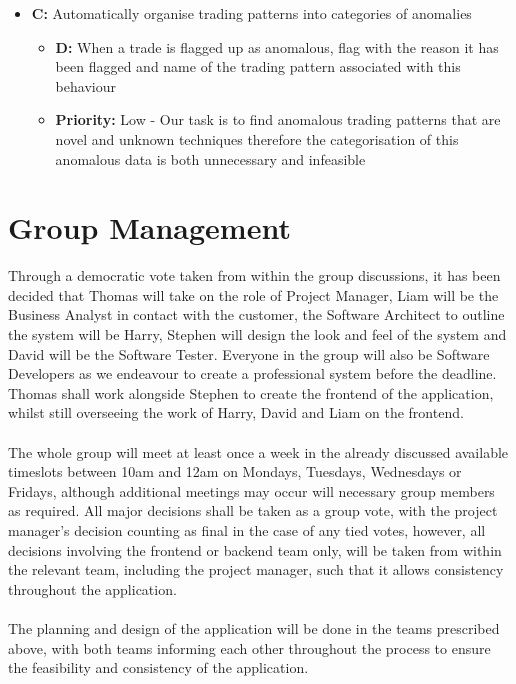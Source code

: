 \documentclass[11pt, oneside, a4paper]{article}
\begin{document}
\begin{itemize}
\begin{itemize}
	\end{itemize}
	\item \textbf{C:} Automatically organise trading patterns into categories of anomalies
	\begin{itemize}
		\item \textbf{D:} When a trade is flagged up as anomalous, flag with the reason it has been flagged and name of the trading pattern associated with this behaviour
		\item \textbf{Priority:} Low - Our task is to find anomalous trading patterns that are novel and unknown techniques therefore the categorisation of this anomalous data is both unnecessary and infeasible
	\end{itemize}
\end{itemize}

\section{Group Management}
Through a democratic vote taken from within the group discussions, it has been decided that Thomas will take on the role of
Project Manager, Liam will be the Business Analyst in contact with the customer, the Software Architect to outline the system
will be Harry, Stephen will design the look and feel of the system and David will be the Software Tester. Everyone in the group
will also be Software Developers as we endeavour to create a professional system before the deadline. Thomas shall work alongside
Stephen to create the frontend of the application, whilst still overseeing the work of Harry, David and Liam on the frontend. \\\\
The whole group will meet at least once a week in the already discussed available timeslots between 10am and 12am on Mondays, Tuesdays,
Wednesdays or Fridays, although additional meetings may occur will necessary group members as required. All major decisions shall
be taken as a group vote, with the project manager's decision counting as final in the case of any tied votes, however, all decisions
involving the frontend or backend team only, will be taken from within the relevant team, including the project manager, such that it
allows consistency throughout the application.\\\\
The planning and design of the application will be done in the teams prescribed above, with both teams informing each other throughout
the process to ensure the feasibility and consistency of the application.
\end{document}
